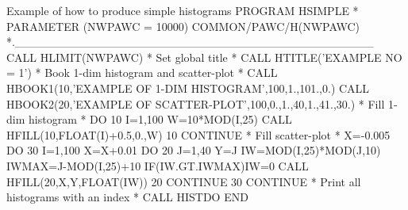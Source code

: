\begin{XMPt}{Example of how to produce simple histograms}
      PROGRAM HSIMPLE
*
      PARAMETER (NWPAWC = 10000)
      COMMON/PAWC/H(NWPAWC)
*.___________________________________________
      CALL HLIMIT(NWPAWC)
*                       Set global title
*
      CALL HTITLE('EXAMPLE NO = 1')
*                       Book 1-dim histogram and scatter-plot
*
      CALL HBOOK1(10,'EXAMPLE OF 1-DIM HISTOGRAM',100,1.,101.,0.)
      CALL HBOOK2(20,'EXAMPLE OF SCATTER-PLOT',100,0.,1.,40,1.,41.,30.)
*                       Fill 1-dim histogram
*
      DO 10 I=1,100
         W=10*MOD(I,25)
         CALL HFILL(10,FLOAT(I)+0.5,0.,W)
  10  CONTINUE
*                       Fill scatter-plot
*
      X=-0.005
      DO 30 I=1,100
         X=X+0.01
         DO 20 J=1,40
            Y=J
            IW=MOD(I,25)*MOD(J,10)
            IWMAX=J-MOD(I,25)+10
            IF(IW.GT.IWMAX)IW=0
            CALL HFILL(20,X,Y,FLOAT(IW))
  20     CONTINUE
  30  CONTINUE
*                       Print all histograms with an index
*
      CALL HISTDO
      END
\end{XMPt}
\newpage%
